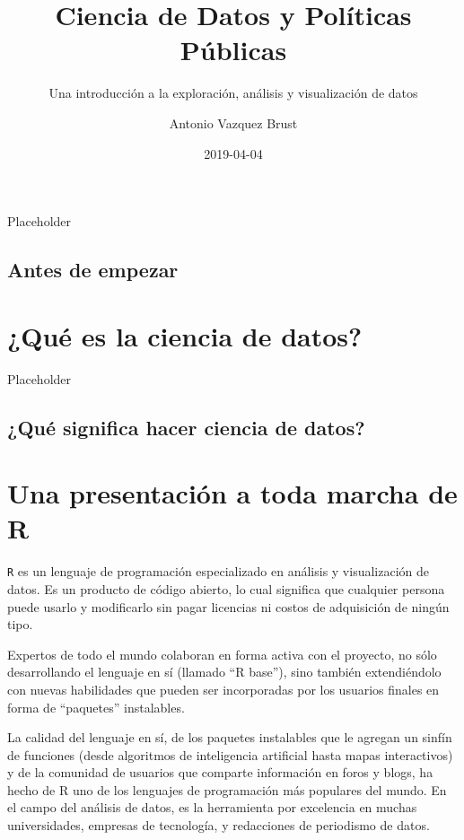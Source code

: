 \documentclass[]{book}
\title{Ciencia de Datos y Políticas Públicas}
\subtitle{Una introducción a la exploración, análisis y visualización de datos}
\author{Antonio Vazquez Brust}
\date{2019-04-04}
\begin{document}
\maketitle

{
\setcounter{tocdepth}{1}
\tableofcontents
}
\chapter*{}\label{section}

Placeholder

\section*{Antes de empezar}\label{antes-de-empezar}

\chapter{¿Qué es la ciencia de datos?}\label{que-es-la-ciencia-de-datos}

Placeholder

\section{¿Qué significa hacer ciencia de
datos?}\label{que-significa-hacer-ciencia-de-datos}

\chapter{Una presentación a toda marcha de
R}\label{una-presentacion-a-toda-marcha-de-r}

\texttt{R} es un lenguaje de programación especializado en análisis y
visualización de datos. Es un producto de código abierto, lo cual
significa que cualquier persona puede usarlo y modificarlo sin pagar
licencias ni costos de adquisición de ningún tipo.

Expertos de todo el mundo colaboran en forma activa con el proyecto, no
sólo desarrollando el lenguaje en sí (llamado ``R base''), sino también
extendiéndolo con nuevas habilidades que pueden ser incorporadas por los
usuarios finales en forma de ``paquetes'' instalables.

La calidad del lenguaje en sí, de los paquetes instalables que le
agregan un sinfín de funciones (desde algoritmos de inteligencia
artificial hasta mapas interactivos) y de la comunidad de usuarios que
comparte información en foros y blogs, ha hecho de R uno de los
lenguajes de programación más populares del mundo. En el campo del
análisis de datos, es la herramienta por excelencia en muchas
universidades, empresas de tecnología, y redacciones de periodismo de
datos.
\end{document}
